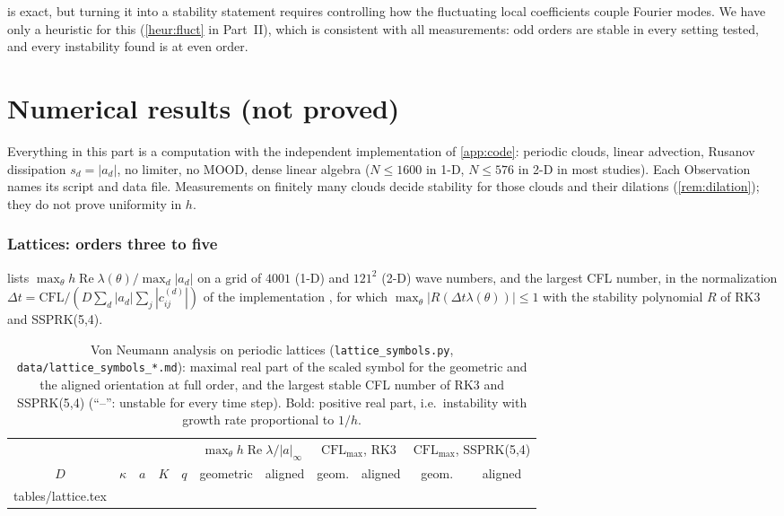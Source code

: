 \documentclass[11pt,a4paper]{article}
\makeatletter
\theoremstyle{plain}
\theoremstyle{definition}
\theoremstyle{remark}
\numberwithin{equation}{section}
\newcommand{\CFL}{\mathrm{CFL}}
\renewcommand{\Re}{\operatorname{Re}}
\newcommand{\A}[1]{\cite[#1]{Addendum}}
\newcommand{\inputrows}[1]{\@@input #1 }%
\makeatother
\begin{document}
 is exact, but turning it into a stability statement requires controlling how the fluctuating local coefficients couple Fourier modes. We have only a heuristic for this (\cref{heur:fluct} in Part~II), which is consistent with all measurements: odd orders are stable in every setting tested, and every instability found is at even order.

\part{Numerical results (not proved)}

Everything in this part is a computation with the independent implementation of \cref{app:code}: periodic clouds, linear advection, Rusanov dissipation $s_d=|a_d|$, no limiter, no MOOD, dense linear algebra ($N\le1600$ in 1-D, $N\le576$ in 2-D in most studies). Each Observation names its script and data file. Measurements on finitely many clouds decide stability for those clouds and their dilations (\cref{rem:dilation}); they do not prove uniformity in $h$.

\section{Lattices: orders three to five}\label{sec:numlattice}

 lists $\max_\theta h\Re\lambda(\theta)/\max_d|a_d|$ on a grid of $4001$ (1-D) and $121^2$ (2-D) wave numbers, and the largest CFL number, in the normalization $\Delta t=\CFL/(D\sum_d|a_d|\sum_j|c^{(d)}_{ij}|)$ of the implementation \A{Rem.~6.5(iii)}, for which $\max_\theta|R(\Delta t\lambda(\theta))|\le1$ with the stability polynomial $R$ of RK3 and SSPRK(5,4).

\begin{table}[t]
\centering
\caption{Von Neumann analysis on periodic lattices (\texttt{lattice\_symbols.py}, \texttt{data/lattice\_symbols\_*.md}): maximal real part of the scaled symbol for the geometric and the aligned orientation at full order, and the largest stable CFL number of RK3 and SSPRK(5,4) (``--'': unstable for every time step). Bold: positive real part, i.e.\ instability with growth rate proportional to $1/h$.}\label{tab:lattice}
\small
\begin{tabular}{ccccccccccc}
\toprule
& & & & & \multicolumn{2}{c}{$\max_\theta h\Re\lambda/|a|_\infty$} & \multicolumn{2}{c}{$\CFL_{\max}$, RK3} & \multicolumn{2}{c}{$\CFL_{\max}$, SSPRK(5,4)}\\
\cmidrule(lr){6-7}\cmidrule(lr){8-9}\cmidrule(lr){10-11}
$D$ & $\kappa$ & $a$ & $K$ & $q$ & geometric & aligned & geom. & aligned & geom. & aligned\\
\midrule
\inputrows{tables/lattice.tex}
\bottomrule
\end{tabular}
\end{table}
\end{document}
